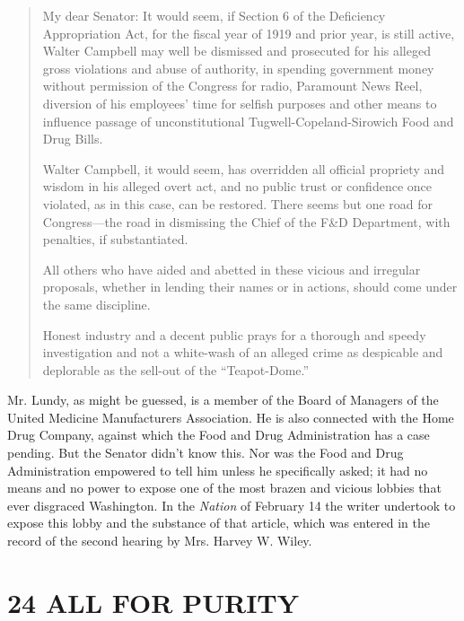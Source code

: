 \documentclass[openany,nobib]{tufte-book}
\let\oldchapter\chapter
\def\chapter{%
  \setcounter{footnote}{0}%
  \oldchapter
}
\begin{document}
\begin{quote}
My dear Senator: It would seem, if Section 6 of the Deficiency
Appropriation Act, for the fiscal year of 1919 and prior year, is still
active, Walter Campbell may well be dismissed and prosecuted for his
alleged gross violations and abuse of authority, in spending government
money without permission of the Congress for radio, Paramount News Reel,
diversion of his employees' time for selfish purposes and other means to
influence passage of unconstitutional Tugwell-Copeland-Sirowich Food and
Drug Bills.

Walter Campbell, it would seem, has overridden all official propriety
and wisdom in his alleged overt act, and no public trust or confidence
once violated, as in this case, can be restored. There seems but one
road for Congress---the road in dismissing the Chief of the F\&D
Department, with penalties, if substantiated.

All others who have aided and abetted in these vicious and irregular
proposals, whether in lending their names or in actions, should come
under the same discipline.

Honest industry and a decent public prays for a thorough and speedy
investigation and not a white-wash of an alleged crime as despicable and
deplorable as the sell-out of the ``Teapot-Dome.''
\end{quote}

Mr. Lundy, as might be guessed, is a member of the Board of Managers of
the United Medicine Manufacturers Association. He is also connected with
the Home Drug Company, against which the Food and Drug Administration
has a case pending. But the Senator didn't know this. Nor was the Food
and Drug Administration empowered to tell him unless he specifically
asked; it had no means and no power to expose one of the most brazen and
vicious lobbies that ever disgraced Washington. In the \emph{Nation} of
February 14 the writer undertook to expose this lobby and the substance
of that article, which was entered in the record of the second hearing
by Mrs. Harvey W. Wiley.




\chapter[24 \hspace*{1mm} ALL FOR PURITY]{24 ALL FOR PURITY}
\end{document}

